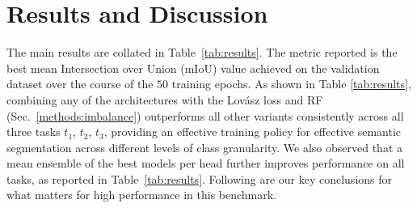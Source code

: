 \documentclass[runningheads]{llncs}
\newcommand{\lov}{Lov\'{a}sz}
\newcommand{\ta}[1]{\textbf{$t_{#1}$}}
\begin{document}
\section{Results and Discussion}\label{results}
The main results are collated in Table~\ref{tab:results}. The metric reported is the best mean Intersection over Union (mIoU) value achieved on the validation dataset over the course of the $50$ training epochs. As shown in Table \ref{tab:results}, combining any of the architectures with the \lov{} loss and RF (Sec.~\ref{methods:imbalance}) outperforms all other variants consistently across all three tasks \ta1, \ta2, \ta3, providing an effective training policy for effective semantic segmentation across different levels of class granularity. We also observed that a mean ensemble of the best models per head further improves performance on all tasks, as reported in Table~\ref{tab:results}. Following are our key conclusions for what matters for high performance in this benchmark.
\end{document}
